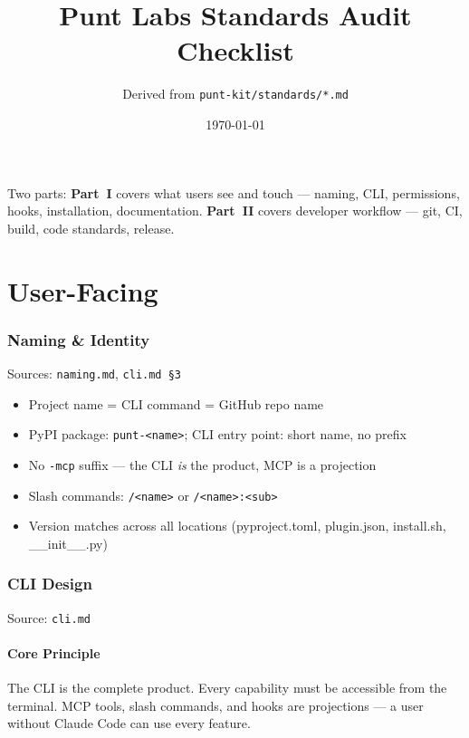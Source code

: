 \documentclass[a4paper,10pt]{article}
\begin{document}
\title{Punt Labs Standards Audit Checklist}
\author{Derived from \texttt{punt-kit/standards/*.md}}
\date{\today}
\maketitle

\noindent Two parts: \textbf{Part~I} covers what users see and touch ---
naming, CLI, permissions, hooks, installation, documentation.
\textbf{Part~II} covers developer workflow --- git, CI, build, code
standards, release.

\tableofcontents
\newpage

% 
% 

\part{User-Facing}

\section{Naming \& Identity}
\label{sec:naming}
Sources: \texttt{naming.md}, \texttt{cli.md~\S3}

\begin{itemize}
  \item Project name = CLI command = GitHub repo name
  \item PyPI package: \texttt{punt-<name>}; CLI entry point: short name, no prefix
  \item No \texttt{-mcp} suffix --- the CLI \emph{is} the product, MCP is a projection
  \item Slash commands: \texttt{/<name>} or \texttt{/<name>:<sub>}
  \item Version matches across all locations (pyproject.toml, plugin.json, install.sh, \_\_init\_\_.py)
\end{itemize}

\section{CLI Design}
\label{sec:cli}
Source: \texttt{cli.md}

\subsection{Core Principle}
The CLI is the complete product. Every capability must be accessible from the
terminal. MCP tools, slash commands, and hooks are projections --- a user
without Claude Code can use every feature.
\end{document}
